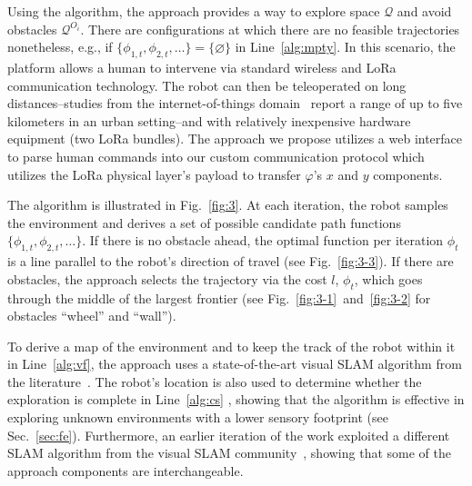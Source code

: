 \documentclass[lettersize,journal,twoside]{IEEEtran}
\theoremstyle{definition}
\begin{document}
Using the algorithm, the %
approach provides a way to explore space $\mathcal{Q}$ and avoid obstacles $\mathcal{Q}^{O_i}$. There are configurations at which there are no feasible trajectories nonetheless, e.g., if $\{\phi_{1,t},\phi_{2,t},\dots\}=\{\varnothing\}$ in Line~\ref{alg:mpty}. In this scenario, the %
platform allows a human to intervene via standard wireless and LoRa communication technology. The robot can then be teleoperated on long distances--studies from the internet-of-things domain~\cite{shanmuga2020survey%
} report a range of up to five kilometers in an urban setting--and with relatively inexpensive hardware equipment (two LoRa bundles). The %
approach we propose utilizes a web interface to parse human commands into our custom communication protocol which utilizes the LoRa physical layer's payload to transfer $\varphi$'s $x$ and $y$ components.

The algorithm is illustrated in Fig.~\ref{fig:3}. At each iteration, the robot samples the environment and derives a set of possible candidate path functions $\{\phi_{1,t},\phi_{2,t},\dots\}$. If there is no obstacle ahead, the optimal function per iteration $\phi_t$ is a line parallel to the robot's direction of travel (see Fig.~\ref{fig:3-3}). If there are obstacles, the %
approach selects the trajectory via the cost $l$, $\phi_t$, which goes through the middle of the largest frontier (see Fig.~\ref{fig:3-1}~and~\ref{fig:3-2} for %
obstacles ``wheel'' and ``wall'').

To derive a map of the environment and to keep the track of the robot within it in Line~\ref{alg:vf}, the %
approach uses a state-of-the-art visual SLAM algorithm from the literature~\cite{labbe2019rtab}. The robot's location is also used to determine whether the exploration is complete in Line~\ref{alg:cs}%
, showing that the algorithm is effective in exploring unknown environments with a lower sensory footprint (see Sec.~\ref{sec:fe}). Furthermore, an earlier iteration of the work exploited a different SLAM algorithm from the visual SLAM community~\cite{campos2021orb}, showing that some of the %
approach components are interchangeable.
\end{document}

